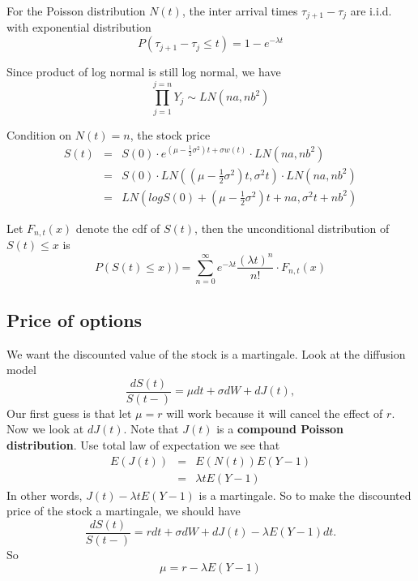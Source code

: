 \documentclass[12pt]{amsart}
\theoremstyle{definition}
\theoremstyle{remark}
\begin{document}
For the Poisson distribution $N(t)$, the inter arrival times $\tau_{j+1}-\tau_j$ are i.i.d. with exponential distribution
\begin{equation*}
P(\tau_{j+1}-\tau_j \le t)= 1-e^{-\lambda t}
\end{equation*}

Since product of log normal is still log normal, we have 
\begin{equation*}
\prod_{j=1}^{j=n} Y_j \sim LN(na, nb^2)
\end{equation*}

Condition on $N(t) = n$, the stock price
\begin{eqnarray*}
S(t) &=& S(0)\cdot e^{(\mu-\frac{1}{2}\sigma^2)t +\sigma w(t)}\cdot LN(na, nb^2)\\
&=& S(0)\cdot LN((\mu -\frac{1}{2}\sigma ^2)t, \sigma^2 t)\cdot LN(na, nb^2)\\
&=& LN( logS(0)+(\mu - \frac{1}{2}\sigma ^2)t +na, \sigma ^2t+ nb^2)
\end{eqnarray*}

Let $F_{n,t}(x)$ denote the cdf of $S(t)$, then the unconditional distribution of $S(t)\le x$ is 
\begin{equation*}
P(S(t)\le x))= \sum_{n=0}^{\infty} e^{-\lambda t}\frac{(\lambda t)^n}{n!} \cdot F_{n,t}(x)
\end{equation*}

\subsection{Price of options}

We want the discounted value of the stock is a martingale. Look at the diffusion model
\begin{equation*}
\frac{dS(t)}{S(t-)} = \mu dt +\sigma dW+dJ(t),
\end{equation*}
Our first guess is that let $\mu = r$ will work because it will cancel the effect of $r$.
Now we look at $dJ(t)$.
Note that $J(t)$ is a \textbf{compound Poisson distribution}. Use  total law of expectation we see that 
\begin{eqnarray*}
E(J(t)) &=& E(N(t)) E(Y-1)\\
&=& \lambda t E(Y-1)
\end{eqnarray*}
In other words, $J(t)- \lambda t E(Y-1)$ is a martingale. So to make the discounted price of the stock a martingale, we should have
\begin{equation*}
\frac{dS(t)}{S(t-)} = r dt +\sigma dW+dJ(t) - \lambda E(Y-1) dt.
\end{equation*}
So 
\begin{equation*}
\mu = r-\lambda E(Y-1)
\end{equation*}
\end{document}
